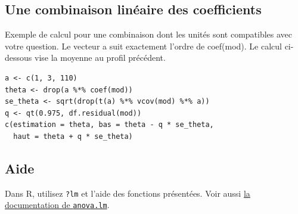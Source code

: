 \documentclass[letterpaper,11pt]{article}
\begin{document}
\par\medskip\noindent\begin{minipage}{\linewidth}
\subsection*{Une combinaison linéaire des coefficients}
Exemple de calcul pour une combinaison dont les unités sont compatibles avec votre question. Le vecteur a suit exactement l'ordre de coef(mod). Le calcul ci-dessous vise la moyenne au profil précédent.
\begin{Verbatim}
a <- c(1, 3, 110)
theta <- drop(a %*% coef(mod))
se_theta <- sqrt(drop(t(a) %*% vcov(mod) %*% a))
q <- qt(0.975, df.residual(mod))
c(estimation = theta, bas = theta - q * se_theta,
  haut = theta + q * se_theta)
\end{Verbatim}

\end{minipage}\par
\par\medskip\noindent\begin{minipage}{\linewidth}
\subsection*{Aide}
Dans R, utilisez \texttt{?lm} et l’aide des fonctions présentées. Voir aussi \href{https://stat.ethz.ch/R-manual/R-devel/library/stats/html/anova.lm.html}{la documentation de \texttt{anova.lm}}.
\end{minipage}\par
\end{document}
